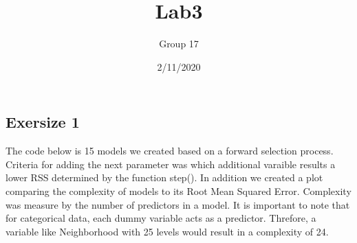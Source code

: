 \documentclass[
]{article}
\title{Lab3}
\author{Group 17}
\date{2/11/2020}
\begin{document}
\maketitle

\hypertarget{exersize-1}{%
\subsection{Exersize 1}\label{exersize-1}}

The code below is 15 models we created based on a forward selection
process. Criteria for adding the next parameter was which additional
varaible results a lower RSS determined by the function step(). In
addition we created a plot comparing the complexity of models to its
Root Mean Squared Error. Complexity was measure by the number of
predictors in a model. It is important to note that for categorical
data, each dummy variable acts as a predictor. Threfore, a variable like
Neighborhood with 25 levels would result in a complexity of 24.
\end{document}
